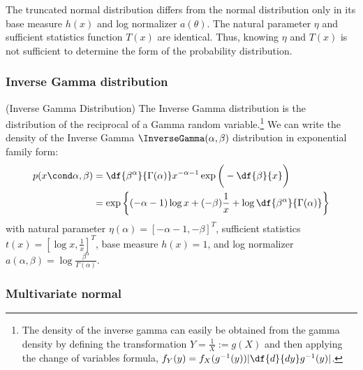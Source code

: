 \documentclass{article} %
\begin{document}
\begin{remark}
The truncated normal distribution differs from the normal distribution only in its base measure $h(x)$ and log normalizer $a(\theta)$.  The natural parameter $\eta$ and sufficient statistics function $T(x)$ are identical.   Thus,  knowing $\eta$ and $T(x)$ is not sufficient to determine the form of the probability distribution.
\end{remark}


\subsubsection{Inverse Gamma distribution}

\begin{example}{(Inverse Gamma Distribution)} 
\label{ex:inverse_gamma_as_ef} The Inverse Gamma distribution is the distribution of the reciprocal of a Gamma random variable.\footnote{The density of the inverse gamma can easily be obtained from the gamma density by defining the transformation $Y = \frac{1}{X} := g(X)$ and then applying the change of variables formula,  $f_Y(y) = f_X (g^{-1}(y)) | \df{d}{dy} g^{-1}(y)|$.}  We can write the density of the Inverse Gamma $\InverseGamma(\alpha,  \beta)$ distribution in exponential family form:
\begin{align*}
p (x \cond \alpha,  \beta) &= \df{\beta^\alpha}{ \Gamma (\alpha) } x^{-\alpha -1} \exp \bigg(- \df{\beta}{x} \bigg) \\
&= \exp \bigg\{ (-\alpha - 1) \log x + (- \beta) \frac{1}{x} + \log \df{\beta^\alpha}{\Gamma(\alpha)} \bigg\}
\end{align*}
with natural parameter $\eta(\alpha) = [-\alpha-1,  -\beta]^T$, sufficient statistics $t(x) = [\log x ,  \frac{1}{x}]^T$, base measure $h(x)=1$, and log normalizer $a(\alpha,  \beta) =  \log \frac{\beta^\alpha}{\Gamma(\alpha)} $. 
  
\end{example} 

\subsubsection{Multivariate normal}
\end{document}

